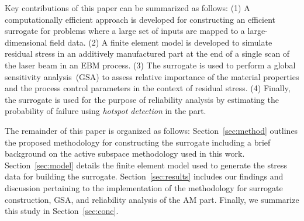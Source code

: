 Key contributions of this paper can be summarized as follows: (1) A computationally efficient approach is developed
for constructing an efficient surrogate for problems where a large set of inputs are mapped to a large-dimensional
field data. (2) A finite element model is developed to simulate residual stress in an additively manufactured part
at the end of a single scan of the laser beam in an EBM process. (3) The surrogate is used to perform a global
sensitivity analysis~(GSA) to assess relative importance of the material properties and the process control parameters
in the context of residual stress. (4) Finally, the surrogate is used for the purpose of reliability analysis by estimating the
probability of failure using \textit{hotspot detection} in the part. 

The remainder of this paper is organized as follows: Section~\ref{sec:method} outlines the proposed methodology for
constructing the surrogate including a brief background on the active subspace methodology used in this work.
Section~\ref{sec:model} details the finite element model used to generate the stress data for building the surrogate.
Section~\ref{sec:results} includes our findings and discussion pertaining to the implementation of the methodology 
for surrogate construction, GSA, and reliability analysis of the AM part. 
Finally, we summarize this study in Section~\ref{sec:conc}. 



